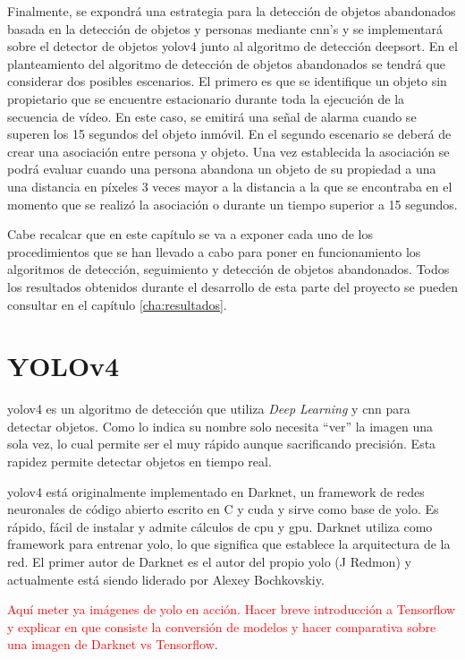 Finalmente, se expondrá una estrategia para la detección de objetos abandonados basada en la detección de objetos y personas mediante \gls{cnn}'s y se implementará sobre el detector de objetos \gls{yolov4} junto al algoritmo de detección \gls{deepsort}. En el planteamiento del algoritmo de detección de objetos abandonados se tendrá que considerar dos posibles escenarios. El primero es que se identifique un objeto sin propietario que se encuentre estacionario durante toda la ejecución de la secuencia de vídeo. En este caso, se emitirá una señal de alarma cuando se superen los 15 segundos del objeto inmóvil. En el segundo escenario se deberá de crear una asociación entre persona y objeto. Una vez establecida la asociación se podrá evaluar cuando una persona abandona un objeto de su propiedad a una una distancia en píxeles 3 veces mayor a la distancia a la que se encontraba en el momento que se realizó la asociación o durante un tiempo superior a 15 segundos.

Cabe recalcar que en este capítulo se va a exponer cada uno de los procedimientos que se han llevado a cabo para poner en funcionamiento los algoritmos de detección, seguimiento y detección de objetos abandonados. Todos los resultados obtenidos durante el desarrollo de esta parte del proyecto se pueden consultar en el capítulo \ref{cha:resultados}.

\section{YOLOv4}
\label{sec:desarrollo-yolov4}

\gls{yolov4} es un algoritmo de detección que utiliza \textit{Deep Learning} y \gls{cnn} para detectar objetos. Como lo indica su nombre solo necesita ``ver'' la imagen una sola vez, lo cual permite ser el muy rápido aunque sacrificando precisión. Esta rapidez permite detectar objetos en tiempo real.

\gls{yolov4} está originalmente implementado en Darknet, un framework de redes neuronales de código abierto escrito en C y \gls{cuda} y sirve como base de \gls{yolo}. Es rápido, fácil de instalar y admite cálculos de \gls{cpu} y \gls{gpu}. Darknet utiliza como framework para entrenar \gls{yolo}, lo que significa que establece la arquitectura de la red. El primer autor de Darknet es el autor del propio \gls{yolo} (J Redmon) y actualmente está siendo liderado por Alexey Bochkovskiy.

\textcolor{red}{Aquí meter ya imágenes de yolo en acción. Hacer breve introducción a Tensorflow y explicar en que consiste la conversión de modelos y hacer comparativa sobre una imagen de Darknet vs Tensorflow}.

